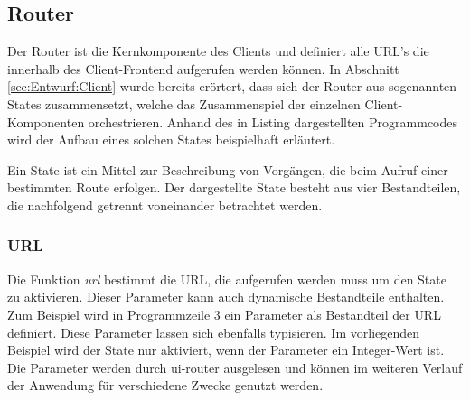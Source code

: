 \subsection{Router}

Der Router ist die Kernkomponente des Clients und definiert alle \ac{URL}'s die innerhalb des Client-Frontend aufgerufen werden können. In Abschnitt \ref{sec:Entwurf:Client} wurde bereits erörtert, dass sich der Router aus sogenannten States zusammensetzt, welche das Zusammenspiel der einzelnen Client-Komponenten orchestrieren. Anhand des in Listing dargestellten Programmcodes wird der Aufbau eines solchen States beispielhaft erläutert.
\begin{program}[H]
\label{prog:router}
\end{program}
Ein State ist ein Mittel zur Beschreibung von Vorgängen, die beim Aufruf einer bestimmten Route erfolgen. Der dargestellte State besteht aus vier Bestandteilen, die nachfolgend getrennt voneinander betrachtet werden.

\subsubsection{URL}

Die Funktion \emph{url} bestimmt die \ac{URL}, die aufgerufen werden muss um den State zu \glqq{}aktivieren\grqq{}. Dieser Parameter kann auch dynamische Bestandteile enthalten. Zum Beispiel wird in Programmzeile 3 ein Parameter als Bestandteil der \ac{URL} definiert. Diese Parameter lassen sich ebenfalls typisieren. Im vorliegenden Beispiel wird der State nur aktiviert, wenn der Parameter ein Integer-Wert ist. Die Parameter werden durch ui-router ausgelesen und können im weiteren Verlauf der Anwendung für verschiedene Zwecke genutzt werden.

